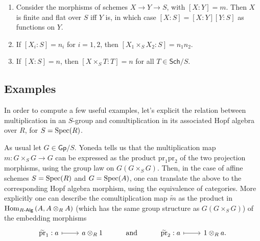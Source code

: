 \begin{prop}\leavevmode\vspace{-.2\baselineskip}
\begin{enumerate}
	\item Consider the morphisms of schemes $X \to Y \to S$, with $[X:Y] = m$.
		Then $X$ is finite and flat over $S$ iff $Y$ is, in which case
		$[X:S] = [X:Y] [Y:S]$ as functions on $Y$.
		
	\item If $[X_i:S] = n_i$ for $i=1,2$, then
		$[X_1 \times_{ S } X_2 : S] = n_1n_2$.

	\item If $[X:S] = n$, then $[X \times_{ S } T : T] = n$
		for all $T \in \mathsf{Sch}/S$.
\end{enumerate}
\end{prop}


\subsection{Examples}
In order to compute a few useful examples, let's explicit the relation between
multiplication in an $S$-group and comultiplication in its associated Hopf algebra over
$R$, for $S = \operatorname{Spec}(R)$.
\begin{rem}\label{rem:ExplicitComult}
	As usual let \(G \in \mathsf{Gp}/S\).
	Yoneda tells us that the multiplication map 
	$m\colon G \times_S G \to G$ can be expressed
	as the product $\mathrm{pr}_1 \mathrm{pr}_2$
	of the two projection morphisms, using the group law
	on $G(G \times_S G)$.
	Then, in the case of affine schemes $S = \operatorname{Spec}(R)$
	and $G = \operatorname{Spec}(A)$, one can translate the above to the corresponding
	Hopf algebra morphism, using the equivalence of categories.
	More explicitly one can describe the comultiplication map
	$\widetilde{m}$ as the product in 
	$\operatorname{Hom}_{R\text{-}\mathsf{Alg}} \left( A, A \otimes_R A \right)$ 
	(which has the same group structure as $G(G \times_S G)$)
	of the embedding morphisms
	\begin{equation*}
	\begin{tikzcd}
		\widetilde{\mathrm{pr}}_1: a \arrow[r, "", mapsto] &
		a \otimes_R 1 &
		\text{and} &
		\widetilde{\mathrm{pr}}_2: a \arrow[r, "", mapsto] &
		1 \otimes_R a
	.\end{tikzcd}
	\end{equation*}
\end{rem}


